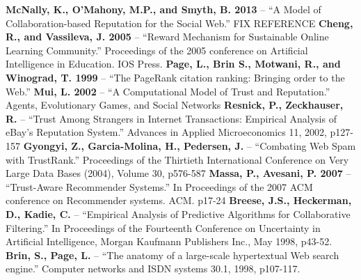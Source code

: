 \documentclass[]{final_report}
\begin{document}
\newpage
\raggedright
\textbf{McNally, K., O'Mahony, M.P., and Smyth, B. 2013} -- ``A Model of Collaboration-based Reputation for the Social Web.'' FIX REFERENCE
\linebreak
\linebreak
\textbf{Cheng, R., and Vassileva, J. 2005} -- ``Reward Mechanism for Sustainable Online Learning Community.'' Proceedings of the 2005 conference on Artificial Intelligence in Education. IOS Press.
\linebreak
\linebreak
\textbf{Page, L., Brin S., Motwani, R., and Winograd, T. 1999} -- ``The PageRank citation ranking: Bringing order to the Web.''
\linebreak
\linebreak
\textbf{Mui, L. 2002} -- ``A Computational Model of Trust and Reputation.'' Agents, Evolutionary Games, and Social Networks
\linebreak
\linebreak
\textbf{Resnick, P., Zeckhauser, R.} -- ``Trust Among Strangers in Internet Transactions: Empirical Analysis of eBay's Reputation System.'' Advances in Applied Microeconomics 11, 2002, p127-157
\linebreak
\linebreak
\textbf{Gyongyi, Z., Garcia-Molina, H., Pedersen, J.} -- ``Combating Web Spam with TrustRank.'' Proceedings of the Thirtieth International Conference on Very Large Data Bases (2004), Volume 30, p576-587
\linebreak
\linebreak
\textbf{Massa, P., Avesani, P. 2007} -- ``Trust-Aware Recommender Systems.'' In Proceedings of the 2007 ACM conference on Recommender systems. ACM. p17-24
\linebreak
\linebreak
\textbf{Breese, J.S., Heckerman, D., Kadie, C.} -- ``Empirical Analysis of Predictive Algorithms for Collaborative Filtering.'' In Proceedings of the Fourteenth Conference on Uncertainty in Artificial Intelligence, Morgan Kaufmann Publishers Inc., May 1998, p43-52.
\linebreak
\linebreak
\textbf{Brin, S., Page, L.} -- ``The anatomy of a large-scale hypertextual Web search engine.'' Computer networks and ISDN systems 30.1, 1998, p107-117.
\end{document}
